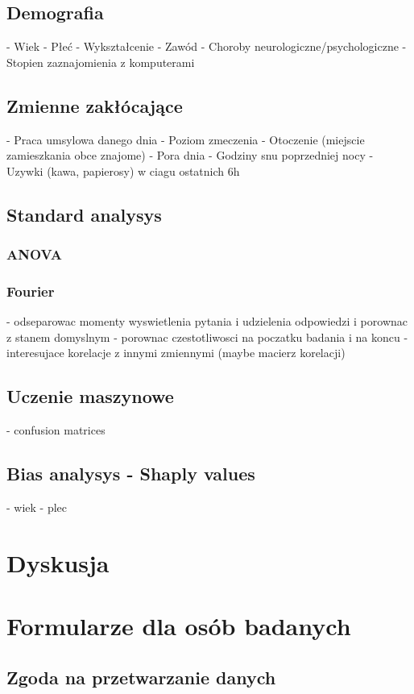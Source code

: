 \documentclass{./assets/wfis}
\begin{document}
\section{Demografia}
- Wiek
- Płeć
- Wykształcenie
- Zawód
- Choroby neurologiczne/psychologiczne
- Stopien zaznajomienia z komputerami
\section{Zmienne zakłócające}\label{zmiennne-zaklucajace}
- Praca umsylowa danego dnia
- Poziom zmeczenia
- Otoczenie (miejscie zamieszkania obce znajome)
- Pora dnia
- Godziny snu poprzedniej nocy
- Uzywki (kawa, papierosy) w ciagu ostatnich 6h
\section{Standard analysys}\label{analiza-klasyczna}
\subsection{ANOVA}
\subsection{Fourier}
- odseparowac momenty wyswietlenia pytania i udzielenia odpowiedzi i porownac z stanem domyslnym
- porownac czestotliwosci na poczatku badania i na koncu
- interesujace korelacje z innymi zmiennymi (maybe macierz korelacji)
\section{Uczenie maszynowe}\label{uczenie-maszynowe}
- confusion matrices
\section{Bias analysys - Shaply values}\label{bias}
- wiek
- plec

\chapter{Dyskusja}\label{dyskusja}

\appendix
\chapter{Formularze dla osób badanych}
\section{Zgoda na przetwarzanie danych}
\end{document}
